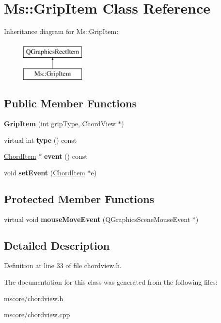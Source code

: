 \hypertarget{class_ms_1_1_grip_item}{}\section{Ms\+:\+:Grip\+Item Class Reference}
\label{class_ms_1_1_grip_item}
Inheritance diagram for Ms\+:\+:Grip\+Item\+:\begin{figure}[H]
\begin{center}
\leavevmode
\includegraphics[height=2.000000cm]{class_ms_1_1_grip_item}
\end{center}
\end{figure}
\subsection*{Public Member Functions}
\begin{DoxyCompactItemize}
\item 
\mbox{\label{class_ms_1_1_grip_item_ac7e2f2f59649e3093e3500a20c5cf291}} 
{\bfseries Grip\+Item} (int grip\+Type, \hyperlink{class_ms_1_1_chord_view}{Chord\+View} $\ast$)
\item 
\mbox{\label{class_ms_1_1_grip_item_ae07a8500214671e29b34078deceeb904}} 
virtual int {\bfseries type} () const
\item 
\mbox{\label{class_ms_1_1_grip_item_ab2c4edb51150b216d1ba24f7cf0508b5}} 
\hyperlink{class_ms_1_1_chord_item}{Chord\+Item} $\ast$ {\bfseries event} () const
\item 
\mbox{\label{class_ms_1_1_grip_item_a8a8a2484de77f0fac28fb8f51fcc143a}} 
void {\bfseries set\+Event} (\hyperlink{class_ms_1_1_chord_item}{Chord\+Item} $\ast$e)
\end{DoxyCompactItemize}
\subsection*{Protected Member Functions}
\begin{DoxyCompactItemize}
\item 
\mbox{\label{class_ms_1_1_grip_item_a4e4c5c79e0608b1c6898d49ec45a1986}} 
virtual void {\bfseries mouse\+Move\+Event} (Q\+Graphics\+Scene\+Mouse\+Event $\ast$)
\end{DoxyCompactItemize}


\subsection{Detailed Description}


Definition at line 33 of file chordview.\+h.



The documentation for this class was generated from the following files\+:\begin{DoxyCompactItemize}
\item 
mscore/chordview.\+h\item 
mscore/chordview.\+cpp\end{DoxyCompactItemize}
